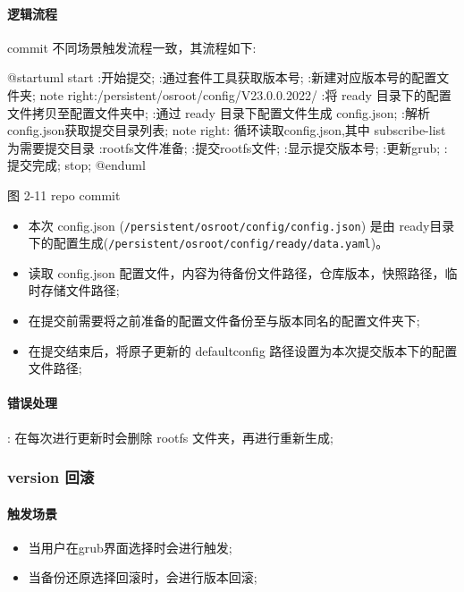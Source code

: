 \documentclass{utart}
\begin{document}
\paragraph{逻辑流程}
commit 不同场景触发流程一致，其流程如下:
\begin{center}
  \begin{adjustbox}{scale=0.65}
    \begin{plantuml}
      @startuml
      start
      :开始提交;
      :通过套件工具获取版本号;
      :新建对应版本号的配置文件夹;
      note right:/persistent/osroot/config/V23.0.0.2022/
      :将 ready 目录下的配置文件拷贝至配置文件夹中;
      :通过 ready 目录下配置文件生成 config.json;
      :解析config.json获取提交目录列表;
      note right: 循环读取config.json,其中 subscribe-list 为需要提交目录
      :rootfs文件准备;
      :提交rootfs文件;
      :显示提交版本号;
      :更新grub;
      :提交完成;
      stop;
      @enduml
    \end{plantuml}
  \end{adjustbox}

  图 2-11 repo commit
\end{center}

\begin{itemize}[leftmargin=4em]
  \item 本次 config.json (\texttt{/persistent/osroot/config/config.json}) 是由 ready目录下的配置生成(\texttt{/persistent/osroot/config/ready/data.yaml})。
  \item 读取 config.json 配置文件，内容为待备份文件路径，仓库版本，快照路径，临时存储文件路径;
  \item 在提交前需要将之前准备的配置文件备份至与版本同名的配置文件夹下;
  \item 在提交结束后，将原子更新的 defaultconfig 路径设置为本次提交版本下的配置文件路径;
\end{itemize}
\paragraph{错误处理}
\begin{description}[leftmargin=!]
  \item[更新rootfs错误:] : 在每次进行更新时会删除 rootfs 文件夹，再进行重新生成;
\end{description}

\subsubsection{version 回滚}
\paragraph{触发场景}
\begin{itemize}[leftmargin=4em]
  \item 当用户在grub界面选择时会进行触发;
  \item 当备份还原选择回滚时，会进行版本回滚;
\end{itemize}
\end{document}
